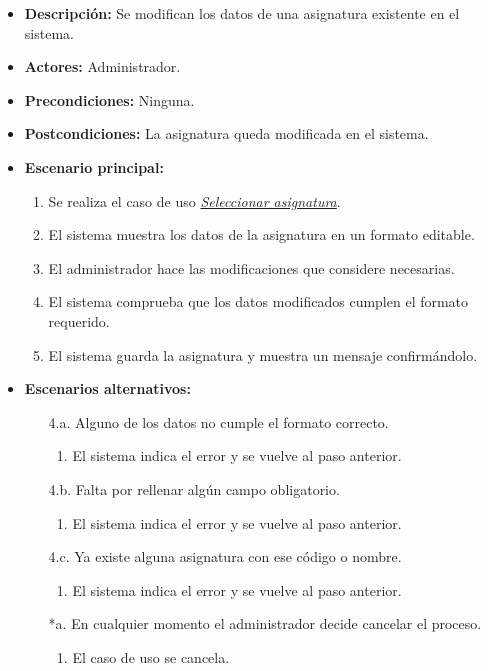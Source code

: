 \begin{itemize}
\item{\bf Descripción:} Se modifican los datos de una asignatura existente en el sistema.
\item{\bf Actores:} Administrador.
\item{\bf Precondiciones:} Ninguna.
\item{\bf Postcondiciones:} La asignatura queda modificada en el sistema.
\item{\bf Escenario principal:}
	\begin{enumerate}
	\item Se realiza el caso de uso {\em \hyperref[select_asignatura]{Seleccionar asignatura}}.
	\item El sistema muestra los datos de la asignatura en un formato editable.
	\item El administrador hace las modificaciones que considere necesarias.
	\item El sistema comprueba que los datos modificados cumplen el formato requerido.
	\item El sistema guarda la asignatura y muestra un mensaje confirmándolo.
	\end{enumerate}
\item{\bf Escenarios alternativos:}
	\begin{itemize}
	\item[4.a.] Alguno de los datos no cumple el formato correcto.
		\begin{enumerate}
		\item El sistema indica el error y se vuelve al paso anterior.
		\end{enumerate}
	\item[4.b.] Falta por rellenar algún campo obligatorio.
		\begin{enumerate}
		\item El sistema indica el error y se vuelve al paso anterior.
		\end{enumerate}
	\item[4.c.] Ya existe alguna asignatura con ese código o nombre.
		\begin{enumerate}
		\item El sistema indica el error y se vuelve al paso anterior.
		\end{enumerate}
	\item[*a.] En cualquier momento el administrador decide cancelar el proceso.
		\begin{enumerate}
		\item El caso de uso se cancela.
		\end{enumerate}
	\end{itemize}
\end{itemize}



